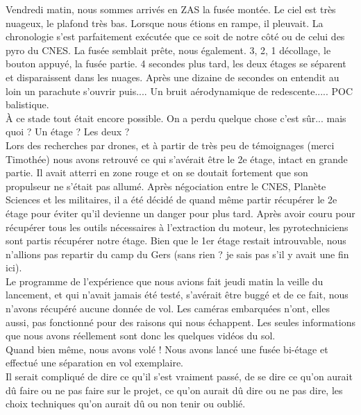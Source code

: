 \documentclass{article}
\begin{document}
Vendredi matin, nous sommes arrivés en ZAS la fusée montée. Le ciel est très nuageux, le plafond très bas. Lorsque nous
étions en rampe, il pleuvait. La chronologie s'est parfaitement exécutée que ce soit de notre côté ou de celui des pyro du
CNES. La fusée semblait prête, nous également. 3, 2, 1 décollage, le bouton appuyé, la fusée partie. 4 secondes plus tard,
les deux étages se séparent et disparaissent dans les nuages. Après une dizaine de secondes on entendit au loin un parachute
s'ouvrir puis.... Un bruit aérodynamique de redescente..... POC balistique.\\

À ce stade tout était encore possible. On a perdu quelque chose c'est sûr... mais quoi ? Un étage ? Les deux ?\\

Lors des recherches par drones, et à partir de très peu de témoignages (merci Timothée) nous avons retrouvé ce qui s'avérait
être le 2e étage, intact en grande partie. Il avait atterri en zone rouge et on se doutait fortement que son propulseur ne
s'était pas allumé. Après négociation entre le CNES, Planète Sciences et les militaires, il a été décidé de quand même partir
récupérer le 2e étage pour éviter qu'il devienne un danger pour plus tard. Après avoir couru pour récupérer tous les outils
nécessaires à l'extraction du moteur, les pyrotechniciens sont partis récupérer notre étage. Bien que le 1er étage restait
introuvable, nous n'allions pas repartir du camp du Gers (sans rien ? je sais pas s'il y avait une fin ici).\\

Le programme de l'expérience que nous avions fait jeudi matin la veille du lancement, et qui n'avait jamais été testé,
s'avérait être buggé et de ce fait, nous n'avons récupéré aucune donnée de vol. Les caméras embarquées n'ont, elles aussi,
pas fonctionné pour des raisons qui nous échappent. Les seules informations que nous avons réellement sont donc les quelques
vidéos du sol.\\

Quand bien même, nous avons volé ! Nous avons lancé une fusée bi-étage et effectué une séparation en vol exemplaire.\\

Il serait compliqué de dire ce qu'il s'est vraiment passé, de se dire ce qu'on aurait dû faire ou ne pas faire sur le
projet, ce qu'on aurait dû dire ou ne pas dire, les choix techniques qu'on aurait dû ou non tenir ou oublié.\\
\end{document}
